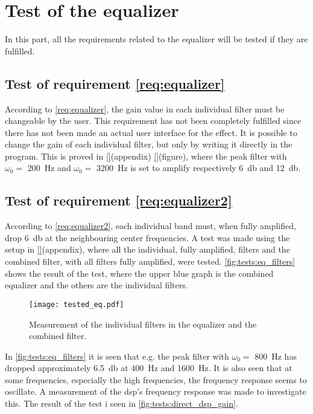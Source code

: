 \newpage
\section{Test of the equalizer}
In this part, all the requirements related to the equalizer will be tested if they are fulfilled. 


\subsection{Test of requirement \autoref{req:equalizer}}
According to \autoref{req:equalizer}, the gain value in each individual filter must be changeable by the user. This requirement has not been completely fulfilled since there has not been made an actual user interface for the effect. It is possible to change the gain of each individual filter, but only by writing it directly in the program. This is proved in \autoref{}(appendix) \autoref{}(figure), where the peak filter with $\omega_0 =$ \SI{200}{\hertz} and $\omega_0 =$ \SI{3200}{\hertz} is set to amplify respectively \SI{6}{\decibel} and \SI{12}{\decibel}. 




\subsection{Test of requirement \autoref{req:equalizer2}}
According to \autoref{req:equalizer2}, each individual band must, when fully amplified, drop \SI{6}{\decibel} at the neighbouring center frequencies. A test was made using  the setup in \autoref{}(appendix), where all the individual, fully amplified, filters and the combined filter, with all filters fully amplified, were tested. \autoref{fig:tests:eq_filters} shows the result of the test, where the upper blue graph is the combined equalizer and the others are the individual filters.

\begin{figure}[htbp!]
    \centering
        \texttt{[image: tested\_eq.pdf]}
        \caption{Measurement of the individual filters in the equalizer and the combined filter.}
        \label{fig:tests:eq_filters}
  \end{figure}
  
 In \autoref{fig:tests:eq_filters} it is seen that e.g. the peak filter with $\omega_0 =$ \SI{800}{\hertz} has dropped approximately \SI{6.5}{\decibel} at \SI{400}{\hertz} and \SI{1600}{\hertz}. It is also seen that at some frequencies, especially the high frequencies, the frequency response seems to oscillate. A measurement of the \gls{dsp}'s frequency response was made to investigate this. The result of the test i seen in \autoref{fig:tests:direct_dsp_gain}.

